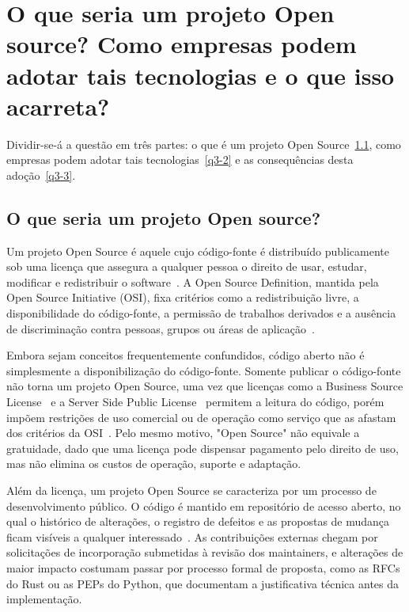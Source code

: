 \section{O que seria um projeto Open source? Como empresas podem adotar tais tecnologias e o que isso acarreta?}

Dividir-se-á a questão em três partes: o que é um projeto Open Source~\ref{q3-1}, como empresas podem adotar tais tecnologias~\ref{q3-2} e as consequências desta adoção~\ref{q3-3}.

\subsection{O que seria um projeto Open source?}
\label{q3-1}
Um projeto Open Source é aquele cujo código-fonte é distribuído publicamente sob uma licença que assegura a qualquer pessoa o direito de usar, estudar, modificar e redistribuir o software~\cite{osi2007definition, ibm2024opensource}. A Open Source Definition, mantida pela Open Source Initiative (OSI), fixa critérios como a redistribuição livre, a disponibilidade do código-fonte, a permissão de trabalhos derivados e a ausência de discriminação contra pessoas, grupos ou áreas de aplicação~\cite{osi2007definition}.

Embora sejam conceitos frequentemente confundidos, código aberto não é simplesmente a disponibilização do código-fonte. Somente publicar o código-fonte não torna um projeto Open Source, uma vez que licenças como a Business Source License~\cite{businessSourceLicense} e a Server Side Public License~\cite{serverSidePublicLicense} permitem a leitura do código, porém impõem restrições de uso comercial ou de operação como serviço que as afastam dos critérios da OSI~\cite{osi2007definition}. Pelo mesmo motivo, "Open Source" não equivale a gratuidade, dado que uma licença pode dispensar pagamento pelo direito de uso, mas não elimina os custos de operação, suporte e adaptação.

Além da licença, um projeto Open Source se caracteriza por um processo de desenvolvimento público. O código é mantido em repositório de acesso aberto, no qual o histórico de alterações, o registro de defeitos e as propostas de mudança ficam visíveis a qualquer interessado~\cite{ibm2024opensource}. As contribuições externas chegam por solicitações de incorporação submetidas à revisão dos maintainers, e alterações de maior impacto costumam passar por processo formal de proposta, como as RFCs do Rust ou as PEPs do Python, que documentam a justificativa técnica antes da implementação.

